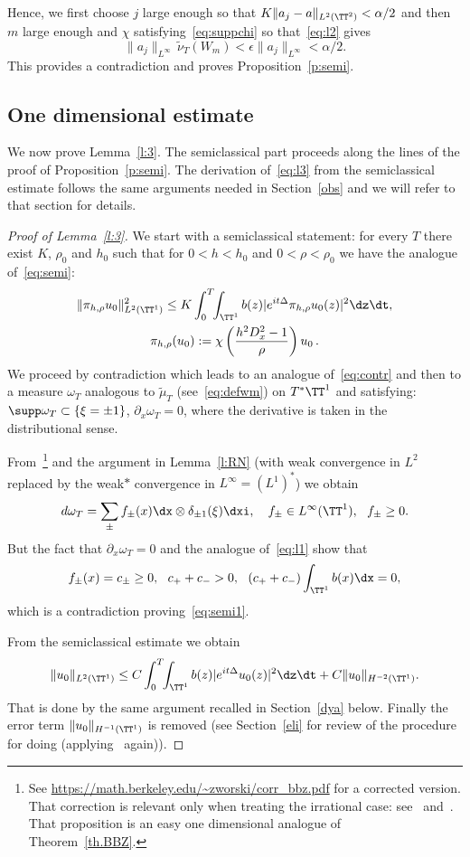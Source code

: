 Hence, we first choose $ j $ large enough so that $ K \| a_j - a \|_{L^2 (\TT^2) } < \alpha/2 $ and then $ m $ large enough and $ \chi $ satisfying~\eqref{eq:suppchi} so that~\eqref{eq:l2} gives
\[
\| a_j \|_{ L^\infty } \, \widetilde \nu_T (W_m) <
\epsilon \| a_j \|_{ L^\infty } < \alpha/2.
\]
This provides a contradiction and proves Proposition~\ref{p:semi}.

\subsection{One dimensional estimate}\label{1D}

We now prove Lemma~\ref{l:3}. The semiclassical part proceeds along the lines of the proof of Proposition~\ref{p:semi}. The derivation of~\eqref{eq:l3} from the semiclassical estimate follows the same arguments needed in Section~\ref{obs} and we will refer to that section for details.

\begin{proof}[Proof of Lemma~\ref{l:3}]
We start with a semiclassical statement: for every $ T $ there exist $ K$, $ \rho_0 $ and $ h_0 $ such that for $ 0 < h < h_0 $ and $ 0 < \rho < \rho_0 $ we have the analogue of~\eqref{eq:semi}:
\begin{multline}\label{eq:semi1}
\| \pi_{h, \rho} u_0 \|_{ L^2 (\TT^1) }^2 \leq K \int_0^T \!\!\int_{ \TT^1}b (z) | e^{ i t \Delta} \pi_{h, \rho} u_0 (z) |^2 \dz \dt,
\\
\pi_{h, \rho} (u_0) := \chi \left(\frac{ h^2 D_x^2 - 1} {\rho} \right) u_0 \,.
\end{multline}
We proceed by contradiction which leads to an analogue of~\eqref{eq:contr} and then to a measure $ \omega_T $ analogous to $ \widetilde \mu_T $ (see~\eqref{eq:defwm}) on $ T^* \TT^1 $ and satisfying: $ \supp \omega_T \subset \{ \xi = \pm 1 \} $, $\partial_x \omega_T = 0$, where the derivative is taken in the distributional sense.

From~\cite[Proposition~2.1]{BBZ}\footnote{See \url{https://math.berkeley.edu/~zworski/corr_bbz.pdf} for a corrected version. That correction is relevant only when treating the irrational case: see~\cite{BZ4} and~\cite{BBZ}. That proposition is an easy one dimensional analogue of Theorem~\ref{th.BBZ}.} and the argument in Lemma~\ref{l:RN} (with weak convergence in $L^2 $ replaced by the weak$*$ convergence in $ L^\infty = (L^1)^* $) we obtain
\[
d \omega_T = \sum_{ \pm } f_\pm (x) \dx \otimes \delta_{\pm 1} (\xi) \dxi, \ \ \ f_\pm \in L^\infty (\TT^1), \ \ f_\pm \geq 0.
\]
But the fact that $ \partial_x \omega_T = 0 $ and the analogue of~\eqref{eq:l1} show that
\[
f_\pm (x) = c_\pm \geq 0, \ \ c_+ + c_- > 0, \ \ (c_+ + c_-)\int _{\TT^1 } b (x) \dx = 0,
\]
which is a contradiction proving~\eqref{eq:semi1}.

From the semiclassical estimate we obtain
\[
\| u_0\|_{L^2 (\TT^1) } \leq C
\int_0^T \!\!\int_{ \TT^1}b (z) | e^{ i t \Delta} u_0 (z) |^2 \dz \dt + C \| u_0 \|_{ H^{-2}(\TT^1)}.
\]
That is done by the same argument recalled in Section~\ref{dya} below. Finally the error term $ \| u_0 \|_{ H^{-1}(\TT^1) } $ is removed (see Section~\ref{eli} for review of the procedure for doing (applying~\cite[Proposition~2.1]{BBZ} again)).
\end{proof}


